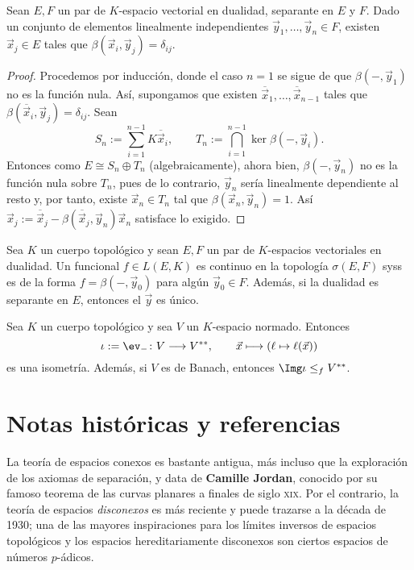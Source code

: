 \documentclass[topologia-analisis.tex]{subfiles}
\begin{document}
\begin{prop}
	Sean $E, F$ un par de $K$-espacio vectorial en dualidad, separante en $E$ y $F$.
	Dado un conjunto de elementos linealmente independientes $\vec y_1, \dots, \vec y_n \in F$,
	existen $\vec x_j \in E$ tales que $\beta(\vec x_i, \vec y_j) = \delta_{ij}$.
\end{prop}
\begin{proof}
	Procedemos por inducción, donde el caso $n = 1$ se sigue de que $\beta(-, \vec y_1)$ no es la función nula.
	Así, supongamos que existen $\overline{\vec x}_1, \dots, \overline{\vec x}_{n-1}$ tales que $\beta(\overline{\vec x}_i, \vec y_j) = \delta_{ij}$.
	Sean
	\[
		S_n := \sum_{i=1}^{n-1} K\overline{\vec x}_i, \qquad T_n := \bigcap_{i=1}^{n-1} \ker\beta(-, \vec y_i).
	\]
	Entonces como $E \cong S_n \oplus T_n$ (algebraicamente),
	ahora bien, $\beta(-, \vec y_n)$ no es la función nula sobre $T_n$, pues de lo contrario, $\vec y_n$ sería linealmente dependiente
	al resto y, por tanto, existe $\vec x_n \in T_n$ tal que $\beta(\vec x_n, \vec y_n) = 1$.
	Así $\vec x_j := \overline{\vec x}_j - \beta(\overline{\vec x}_j, \vec y_n)\vec x_n$ satisface lo exigido.
\end{proof}

\begin{prop}
	Sea $K$ un cuerpo topológico y sean $E, F$ un par de $K$-espacios vectoriales en dualidad.
	Un funcional $f \in L(E, K)$ es continuo en la topología $\sigma(E, F)$ syss es de la forma $f = \beta(-, \vec y_0)$
	para algún $\vec y_0 \in F$.
	Además, si la dualidad es separante en $E$, entonces el $\vec y$ es único.
\end{prop}

\begin{thm}
	Sea $K$ un cuerpo topológico y sea $V$ un $K$-espacio normado.
	Entonces
	\[
		\iota := \ev_- \colon V \longrightarrow V^{**}, \qquad \vec x \longmapsto (\ell \mapsto \ell(\vec x))
	\]
	es una isometría.
	Además, si $V$ es de Banach, entonces $\Img\iota \le_f V^{**}$.
\end{thm}

\section*{Notas históricas y referencias}
La teoría de espacios conexos es bastante antigua, más incluso que la exploración de los axiomas de separación, y data de \textbf{Camille Jordan},
conocido por su famoso teorema de las curvas planares a finales de siglo \textsc{xix}.
Por el contrario, la teoría de espacios \emph{disconexos} es más reciente y puede trazarse a la década de 1930;
una de las mayores inspiraciones para los límites inversos de espacios topológicos y los espacios hereditariamente disconexos son
ciertos espacios de números $p$-ádicos.
\end{document}
